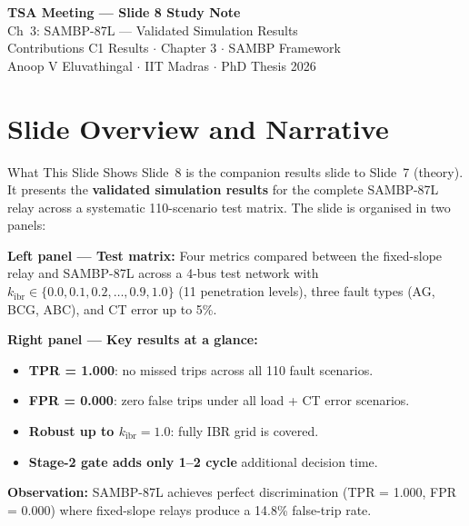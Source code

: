 \documentclass[12pt,a4paper]{article}
\newcommand{\kibr}{k_\mathrm{ibr}}
\begin{document}
\begin{tcolorbox}[colback=iitmnavy,coltext=white,arc=4pt,boxrule=0pt]
\begin{center}
  {\Large\bfseries TSA Meeting --- Slide 8 Study Note}\\[4pt]
  {\large Ch~3: SAMBP-87L --- Validated Simulation Results}\\[6pt]
  {\normalsize Contributions C1 Results $\cdot$ Chapter 3 $\cdot$ SAMBP Framework}\\[2pt]
  {\small Anoop V Eluvathingal $\cdot$ IIT Madras $\cdot$ PhD Thesis 2026}
\end{center}
\end{tcolorbox}

\vspace{6pt}

\section{Slide Overview and Narrative}

\begin{keybox}{What This Slide Shows}
Slide~8 is the companion results slide to Slide~7 (theory). It presents the \textbf{validated simulation results} for the complete SAMBP-87L relay across a systematic 110-scenario test matrix. The slide is organised in two panels:

\textbf{Left panel --- Test matrix:} Four metrics compared between the fixed-slope relay and SAMBP-87L across a 4-bus test network with $\kibr \in \{0.0, 0.1, 0.2, \ldots, 0.9, 1.0\}$ (11 penetration levels), three fault types (AG, BCG, ABC), and CT error up to 5\%.

\textbf{Right panel --- Key results at a glance:}
\begin{itemize}[nosep]
  \item \textbf{TPR = 1.000}: no missed trips across all 110 fault scenarios.
  \item \textbf{FPR = 0.000}: zero false trips under all load + CT error scenarios.
  \item \textbf{Robust up to $\kibr = 1.0$}: fully IBR grid is covered.
  \item \textbf{Stage-2 gate adds only 1--2 cycle} additional decision time.
\end{itemize}

\textbf{Observation:} SAMBP-87L achieves perfect discrimination (TPR = 1.000, FPR = 0.000) where fixed-slope relays produce a 14.8\% false-trip rate.
\end{keybox}
\end{document}
